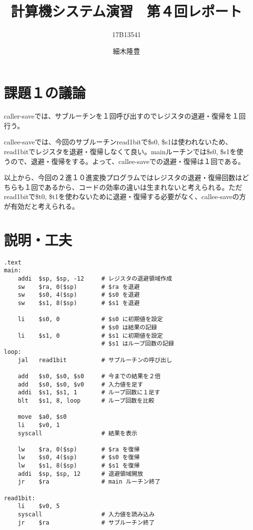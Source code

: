 \documentclass{jarticle}
\title{計算機システム演習　第４回レポート}
\author{17B13541 \and 細木隆豊}
\date{}
\begin{document}
\maketitle
  \section{課題１の議論}
    caller-saveでは、サブルーチンを１回呼び出すのでレジスタの退避・復帰を１回行う。

    callee-saveでは、今回のサブルーチンread1bitで\$s0, \$s1は使われないため、read1bitでレジスタを退避・復帰しなくて良い。mainルーチンでは\$s0, \$s1を使うので、退避・復帰をする。よって、callee-saveでの退避・復帰は１回である。

    以上から、今回の２進１０進変換プログラムではレジスタの退避・復帰回数はどちらも１回であるから、コードの効率の違いは生まれないと考えられる。ただread1bitで\$t0, \$t1を使わないために退避・復帰する必要がなく、callee-saveの方が有効だと考えられる。
  \section{説明・工夫}
    \begin{lstlisting}[caption=assignment1.s]
    .text
main:
    addi  $sp, $sp, -12     # レジスタの退避領域作成
    sw    $ra, 0($sp)       # $ra を退避
    sw    $s0, 4($sp)       # $s0 を退避
    sw    $s1, 8($sp)       # $s1 を退避

    li    $s0, 0            # $s0 に初期値を設定
                            # $s0 は結果の記録
    li    $s1, 0            # $s1 に初期値を設定
                            # $s1 はループ回数の記録
loop:
    jal   read1bit          # サブルーチンの呼び出し

    add   $s0, $s0, $s0     # 今までの結果を２倍
    add   $s0, $s0, $v0     # 入力値を足す
    addi  $s1, $s1, 1       # ループ回数に１足す
    blt   $s1, 8, loop      # ループ回数を比較

    move  $a0, $s0
    li    $v0, 1
    syscall                 # 結果を表示

    lw    $ra, 0($sp)       # $ra を復帰
    lw    $s0, 4($sp)       # $s0 を復帰
    lw    $s1, 8($sp)       # $s1 を復帰
    addi  $sp, $sp, 12      # 退避領域開放
    jr    $ra               # main ルーチン終了

read1bit:
    li    $v0, 5
    syscall                 # 入力値を読み込み
    jr    $ra               # サブルーチン終了
    \end{lstlisting}
\end{document}
